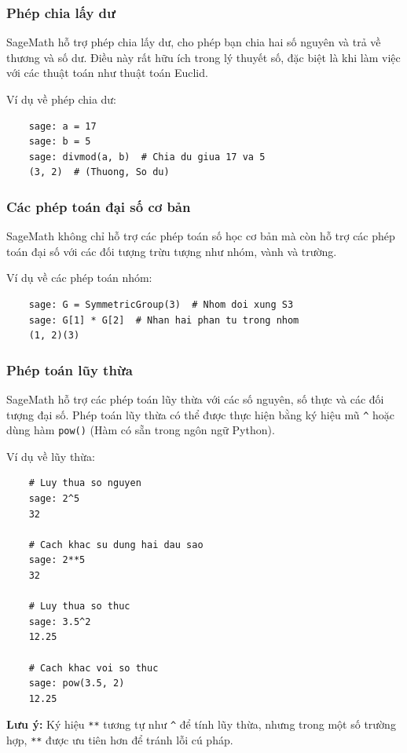 \subsubsection{Phép chia lấy dư}

SageMath hỗ trợ phép chia lấy dư, cho phép bạn chia hai số nguyên và trả về thương và số dư. Điều này rất hữu ích trong lý thuyết số, đặc biệt là khi làm việc với các thuật toán như thuật toán Euclid.

Ví dụ về phép chia dư:

\begin{lstlisting}
	sage: a = 17
	sage: b = 5
	sage: divmod(a, b)  # Chia du giua 17 va 5
	(3, 2)  # (Thuong, So du)
\end{lstlisting}

\subsubsection{Các phép toán đại số cơ bản}

SageMath không chỉ hỗ trợ các phép toán số học cơ bản mà còn hỗ trợ các phép toán đại số với các đối tượng trừu tượng như nhóm, vành và trường.

Ví dụ về các phép toán nhóm:

\begin{lstlisting}
	sage: G = SymmetricGroup(3)  # Nhom doi xung S3
	sage: G[1] * G[2]  # Nhan hai phan tu trong nhom
	(1, 2)(3)
\end{lstlisting}

\subsubsection{Phép toán lũy thừa}

SageMath hỗ trợ các phép toán lũy thừa với các số nguyên, số thực và các đối tượng đại số. Phép toán lũy thừa có thể được thực hiện bằng ký hiệu mũ \texttt{\^} hoặc dùng hàm \texttt{pow()} (Hàm có sẵn trong ngôn ngữ Python).

Ví dụ về lũy thừa:

\begin{lstlisting}
	# Luy thua so nguyen
	sage: 2^5
	32
	
	# Cach khac su dung hai dau sao
	sage: 2**5
	32
	
	# Luy thua so thuc
	sage: 3.5^2
	12.25
	
	# Cach khac voi so thuc
	sage: pow(3.5, 2)
	12.25
\end{lstlisting}

\textbf{Lưu ý:} Ký hiệu \texttt{**} tương tự như \texttt{\^} để tính lũy thừa, nhưng trong một số trường hợp, \texttt{**} được ưu tiên hơn để tránh lỗi cú pháp.


